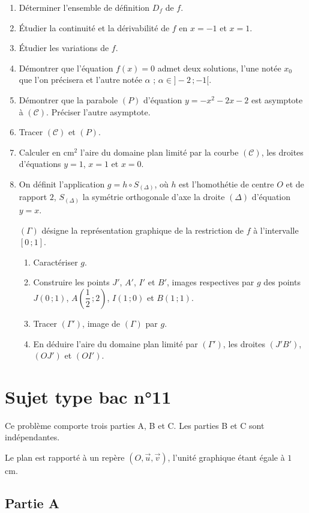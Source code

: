\begin{enumerate}
	\item Déterminer l'ensemble de définition $D_f$ de $f$.
	\item Étudier la continuité et la dérivabilité de $f$ en $x=-1$ et $x=1$.
	\item Étudier les variations de $f$.
	\item Démontrer que l'équation $f(x)=0$ admet deux solutions, l'une notée $x_0$ que l'on précisera et l'autre notée $\alpha$ ; $\alpha\in]-2\,;-1[$.
	\item Démontrer que la parabole $(P)$ d'équation $y=-x^2-2x-2$ est asymptote à $(\mathscr{C})$. Préciser l'autre asymptote.
	\item Tracer $(\mathscr{C})$ et $(P)$.
	\item Calculer en cm$^2$ l'aire du domaine plan limité par la courbe $(\mathscr{C})$, les droites d'équations $y=1$, $x=1$ et $x=0$.
	\item On définit l'application $g = h\circ S_{(\Delta)}$, où $h$ est l'homothétie de centre $O$ et de rapport $2$, $S_{(\Delta)}$ la symétrie orthogonale d'axe la droite $(\Delta)$ d'équation $y=x$.

	$(\Gamma)$ désigne la représentation graphique de la restriction de $f$ à l'intervalle $[0\,;1]$.
	\begin{enumerate}
		\item Caractériser $g$.
		\item Construire les points $J'$, $A'$, $I'$ et $B'$, images respectives par $g$ des points $J(0\,;1)$, $A\!\left(\dfrac12\,;2\right)$, $I(1\,;0)$ et $B(1\,;1)$.
		\item Tracer $(\Gamma')$, image de $(\Gamma)$ par $g$.
		\item En déduire l'aire du domaine plan limité par $(\Gamma')$, les droites $(J'B')$, $(OJ')$ et $(OI')$.
	\end{enumerate}
\end{enumerate}


\section*{Sujet type bac n°11}

Ce problème comporte trois parties A, B et C. Les parties B et C sont indépendantes.

Le plan est rapporté à un repère $(O,\vec{u},\vec{v})$, l'unité graphique étant égale à $1$ cm.

\subsection*{Partie A}


